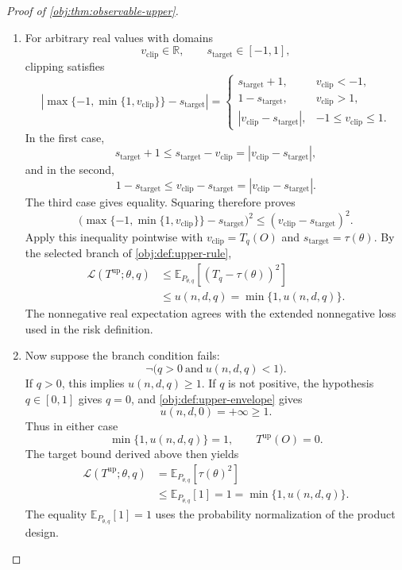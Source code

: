 \begin{proof}[Proof of \cref{obj:thm:observable-upper}]
\begin{enumerate}
\item
For arbitrary real values with domains
\[
v_{\mathrm{clip}}\in\mathbb R,
\qquad
s_{\mathrm{target}}\in[-1,1],
\]
clipping satisfies
\[
\left|\max\{-1,\min\{1,v_{\mathrm{clip}}\}\}
-s_{\mathrm{target}}\right|
=
\begin{cases}
s_{\mathrm{target}}+1,
&v_{\mathrm{clip}}<-1,\\
1-s_{\mathrm{target}},
&v_{\mathrm{clip}}>1,\\
|v_{\mathrm{clip}}-s_{\mathrm{target}}|,
&-1\le v_{\mathrm{clip}}\le1.
\end{cases}
\]
In the first case,
\[
s_{\mathrm{target}}+1
\le s_{\mathrm{target}}-v_{\mathrm{clip}}
=|v_{\mathrm{clip}}-s_{\mathrm{target}}|,
\]
and in the second,
\[
1-s_{\mathrm{target}}
\le v_{\mathrm{clip}}-s_{\mathrm{target}}
=|v_{\mathrm{clip}}-s_{\mathrm{target}}|.
\]
The third case gives equality. Squaring therefore proves
\[
\bigl(\max\{-1,\min\{1,v_{\mathrm{clip}}\}\}
-s_{\mathrm{target}}\bigr)^2
\le
(v_{\mathrm{clip}}-s_{\mathrm{target}})^2.
\]
Apply this inequality pointwise with \(v_{\mathrm{clip}}=T_q(O)\) and \(s_{\mathrm{target}}=\tau(\theta)\). By the selected branch of \cref{obj:def:upper-rule},
\[
\begin{aligned}
\mathcal L(T^{\mathrm{up}};\theta,q)
&\le
\mathbb E_{P_{\theta,q}}
\left[(T_q-\tau(\theta))^2\right]\\
&\le u(n,d,q)
=\min\{1,u(n,d,q)\}.
\end{aligned}
\]
The nonnegative real expectation agrees with the extended nonnegative loss used in the risk definition.

\item
Now suppose the branch condition fails:
\[
\neg\bigl(q>0\ \text{and}\ u(n,d,q)<1\bigr).
\]
If \(q>0\), this implies \(u(n,d,q)\ge1\). If \(q\) is not positive, the hypothesis \(q\in[0,1]\) gives \(q=0\), and \cref{obj:def:upper-envelope} gives
\[
u(n,d,0)=+\infty\ge1.
\]
Thus in either case
\[
\min\{1,u(n,d,q)\}=1,
\qquad
T^{\mathrm{up}}(O)=0.
\]
The target bound derived above then yields
\[
\begin{aligned}
\mathcal L(T^{\mathrm{up}};\theta,q)
&=\mathbb E_{P_{\theta,q}}[\tau(\theta)^2]\\
&\le\mathbb E_{P_{\theta,q}}[1]
=1
=\min\{1,u(n,d,q)\}.
\end{aligned}
\]
The equality \(\mathbb E_{P_{\theta,q}}[1]=1\) uses the probability normalization of the product design.


\end{enumerate}
\end{proof}

